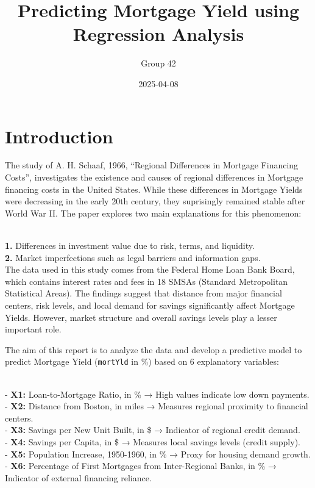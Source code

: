\documentclass[
  11pt,
]{article}
\title{\textbf{Predicting Mortgage Yield using Regression Analysis}}
\author{Group 42}
\date{2025-04-08}
\begin{document}
\maketitle

\section{Introduction}\label{introduction}

The study of A. H. Schaaf, 1966, ``Regional Differences in Mortgage
Financing Costs'', investigates the existence and causes of regional
differences in Mortgage financing costs in the United States. While
these differences in Mortgage Yields were decreasing in the early 20th
century, they suprisingly remained stable after World War II. The paper
explores two main explanations for this phenomenon:\\
\strut \\
\textbf{1.} Differences in investment value due to risk, terms, and
liquidity.\\
\textbf{2.} Market imperfections such as legal barriers and information
gaps.\\

The data used in this study comes from the Federal Home Loan Bank Board,
which contains interest rates and fees in 18 SMSAs (Standard
Metropolitan Statistical Areas). The findings suggest that distance from
major financial centers, risk levels, and local demand for savings
significantly affect Mortgage Yields. However, market structure and
overall savings levels play a lesser important role.

The aim of this report is to analyze the data and develop a predictive
model to predict Mortgage Yield (\texttt{mortYld} in \%) based on 6
explanatory variables:\\
\strut \\
- \textbf{X1:} Loan-to-Mortgage Ratio, in \% → High values indicate low
down payments.\\
- \textbf{X2:} Distance from Boston, in miles → Measures regional
proximity to financial centers.\\
- \textbf{X3:} Savings per New Unit Built, in \$ → Indicator of regional
credit demand.\\
- \textbf{X4:} Savings per Capita, in \$ → Measures local savings levels
(credit supply).\\
- \textbf{X5:} Population Increase, 1950-1960, in \% → Proxy for housing
demand growth.\\
- \textbf{X6:} Percentage of First Mortgages from Inter-Regional Banks,
in \% → Indicator of external financing reliance.
\end{document}
